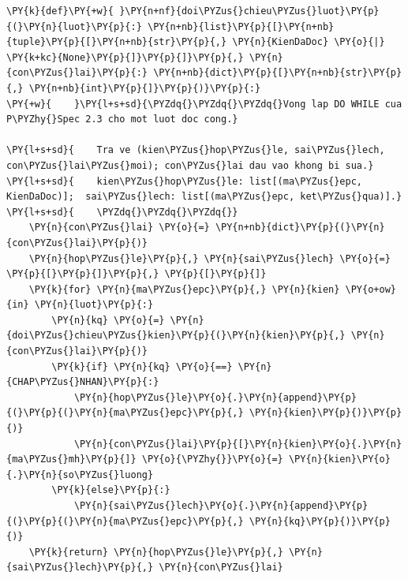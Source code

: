 \begin{Verbatim}[commandchars=\\\{\},frame=single,framerule=0.3pt,rulecolor=\color{black!40},fontsize=\footnotesize,breaklines=true]
\PY{k}{def}\PY{+w}{ }\PY{n+nf}{doi\PYZus{}chieu\PYZus{}luot}\PY{p}{(}\PY{n}{luot}\PY{p}{:} \PY{n+nb}{list}\PY{p}{[}\PY{n+nb}{tuple}\PY{p}{[}\PY{n+nb}{str}\PY{p}{,} \PY{n}{KienDaDoc} \PY{o}{|} \PY{k+kc}{None}\PY{p}{]}\PY{p}{]}\PY{p}{,} \PY{n}{con\PYZus{}lai}\PY{p}{:} \PY{n+nb}{dict}\PY{p}{[}\PY{n+nb}{str}\PY{p}{,} \PY{n+nb}{int}\PY{p}{]}\PY{p}{)}\PY{p}{:}
\PY{+w}{    }\PY{l+s+sd}{\PYZdq{}\PYZdq{}\PYZdq{}Vong lap DO WHILE cua P\PYZhy{}Spec 2.3 cho mot luot doc cong.}

\PY{l+s+sd}{    Tra ve (kien\PYZus{}hop\PYZus{}le, sai\PYZus{}lech, con\PYZus{}lai\PYZus{}moi); con\PYZus{}lai dau vao khong bi sua.}
\PY{l+s+sd}{    kien\PYZus{}hop\PYZus{}le: list[(ma\PYZus{}epc, KienDaDoc)];  sai\PYZus{}lech: list[(ma\PYZus{}epc, ket\PYZus{}qua)].}
\PY{l+s+sd}{    \PYZdq{}\PYZdq{}\PYZdq{}}
    \PY{n}{con\PYZus{}lai} \PY{o}{=} \PY{n+nb}{dict}\PY{p}{(}\PY{n}{con\PYZus{}lai}\PY{p}{)}
    \PY{n}{hop\PYZus{}le}\PY{p}{,} \PY{n}{sai\PYZus{}lech} \PY{o}{=} \PY{p}{[}\PY{p}{]}\PY{p}{,} \PY{p}{[}\PY{p}{]}
    \PY{k}{for} \PY{n}{ma\PYZus{}epc}\PY{p}{,} \PY{n}{kien} \PY{o+ow}{in} \PY{n}{luot}\PY{p}{:}
        \PY{n}{kq} \PY{o}{=} \PY{n}{doi\PYZus{}chieu\PYZus{}kien}\PY{p}{(}\PY{n}{kien}\PY{p}{,} \PY{n}{con\PYZus{}lai}\PY{p}{)}
        \PY{k}{if} \PY{n}{kq} \PY{o}{==} \PY{n}{CHAP\PYZus{}NHAN}\PY{p}{:}
            \PY{n}{hop\PYZus{}le}\PY{o}{.}\PY{n}{append}\PY{p}{(}\PY{p}{(}\PY{n}{ma\PYZus{}epc}\PY{p}{,} \PY{n}{kien}\PY{p}{)}\PY{p}{)}
            \PY{n}{con\PYZus{}lai}\PY{p}{[}\PY{n}{kien}\PY{o}{.}\PY{n}{ma\PYZus{}mh}\PY{p}{]} \PY{o}{\PYZhy{}}\PY{o}{=} \PY{n}{kien}\PY{o}{.}\PY{n}{so\PYZus{}luong}
        \PY{k}{else}\PY{p}{:}
            \PY{n}{sai\PYZus{}lech}\PY{o}{.}\PY{n}{append}\PY{p}{(}\PY{p}{(}\PY{n}{ma\PYZus{}epc}\PY{p}{,} \PY{n}{kq}\PY{p}{)}\PY{p}{)}
    \PY{k}{return} \PY{n}{hop\PYZus{}le}\PY{p}{,} \PY{n}{sai\PYZus{}lech}\PY{p}{,} \PY{n}{con\PYZus{}lai}
\end{Verbatim}
